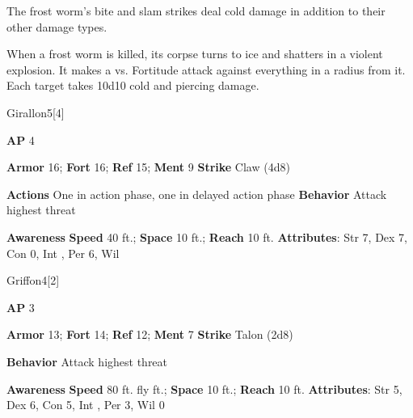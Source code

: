 The frost worm's bite and slam strikes deal cold damage in addition to their other damage types.

\vspace{0.5em}
When a frost worm is killed, its corpse turns to ice and shatters in a violent explosion.
It makes a  vs. Fortitude attack against everything in a \areahuge radius from it.
\hit Each target takes 10d10 cold and piercing damage.

\begin{monsection}{Girallon}{5}[4]
\vspace{-1em}\vspace{-1em}
\begin{spellcontent}
\begin{spelltargetinginfo}
{\textbf{AP} 4}

\pari \textbf{Armor} 16;
\textbf{Fort} 16;
\textbf{Ref} 15;
\textbf{Ment} 9
\pari \textbf{Strike} Claw  (4d8)


\pari \textbf{Actions} One in action phase, one in delayed action phase
\pari \textbf{Behavior} Attack highest threat
\end{spelltargetinginfo}
\end{spellcontent}

\begin{monsterfooter}
\pari \textbf{Awareness} 
\pari \textbf{Speed} 40 ft.;
\textbf{Space} 10 ft.;
\textbf{Reach} 10 ft.
\pari \textbf{Attributes}:
Str 7,
Dex 7,
Con 0,
Int ,
Per 6,
Wil 
\end{monsterfooter}
\end{monsection}

\begin{monsection}{Griffon}{4}[2]
\vspace{-1em}\vspace{-1em}
\begin{spellcontent}
\begin{spelltargetinginfo}
{\textbf{AP} 3}

\pari \textbf{Armor} 13;
\textbf{Fort} 14;
\textbf{Ref} 12;
\textbf{Ment} 7
\pari \textbf{Strike} Talon  (2d8)



\pari \textbf{Behavior} Attack highest threat
\end{spelltargetinginfo}
\end{spellcontent}

\begin{monsterfooter}
\pari \textbf{Awareness} 
\pari \textbf{Speed} 80 ft. fly ft.;
\textbf{Space} 10 ft.;
\textbf{Reach} 10 ft.
\pari \textbf{Attributes}:
Str 5,
Dex 6,
Con 5,
Int ,
Per 3,
Wil 0
\end{monsterfooter}
\end{monsection}


